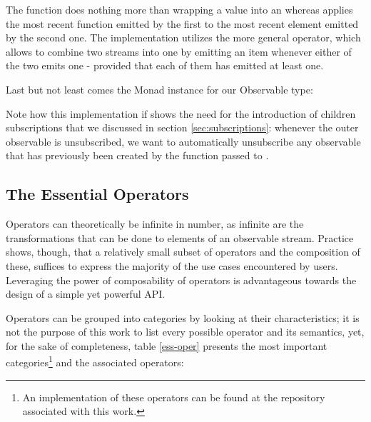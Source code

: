 
The function  does nothing more than wrapping a value into an  whereas \code{(<*>)} applies the most recent function emitted by the first  to the most recent element emitted by the second one. The implementation utilizes the more general  operator, which allows to combine two streams into one by emitting an item whenever either of the two emits one - provided that each of them has emitted at least one. 

Last but not least comes the Monad instance for our Observable type:


Note how this implementation if \code{(>>=)} shows the need for the introduction of children subscriptions that we discussed in section \ref{sec:subscriptions}: whenever the outer observable is unsubscribed, we want to automatically unsubscribe any observable that has previously been created by the function passed to \code{(>>=)}.

\subsection{The Essential Operators}
Operators can theoretically be infinite in number, as infinite are the transformations that can be done to elements of an observable stream. Practice shows, though, that a relatively small subset of operators and the composition of these, suffices to express the majority of the use cases encountered by users. Leveraging the power of composability of operators is advantageous towards the design of a simple yet powerful API.

Operators can be grouped into categories by looking at their characteristics; it is not the purpose of this work to list every possible operator and its semantics, yet, for the sake of completeness, table \ref{ess-oper} presents the most important categories\footnote{An implementation of these operators can be found at the repository associated with this work.} and the associated operators:

